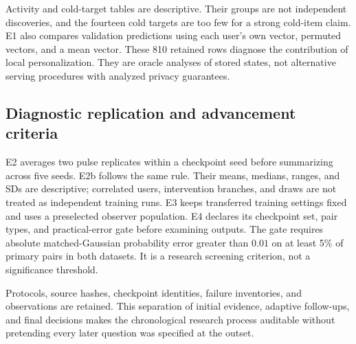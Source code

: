 Activity and cold-target tables are descriptive. Their groups are not
independent discoveries, and the fourteen cold targets are too few for a
strong cold-item claim. E1 also compares validation predictions using each
user's own vector, permuted vectors, and a mean vector. These 810 retained
rows diagnose the contribution of local personalization. They are oracle
analyses of stored states, not alternative serving procedures with analyzed
privacy guarantees.

\subsection{Diagnostic replication and advancement criteria}
E2 averages two pulse replicates within a checkpoint seed before summarizing
across five seeds. E2b follows the same rule. Their means, medians, ranges,
and SDs are descriptive; correlated users, intervention branches, and draws
are not treated as independent training runs. E3 keeps transferred training
settings fixed and uses a preselected observer population. E4 declares its
checkpoint set, pair types, and practical-error gate before examining outputs.
The gate requires absolute matched-Gaussian probability error greater than
$0.01$ on at least 5\% of primary pairs in both datasets. It is a research
screening criterion, not a significance threshold.

Protocols, source hashes, checkpoint identities, failure inventories, and
observations are retained. This separation of initial evidence, adaptive
follow-ups, and final decisions makes the chronological research process
auditable without pretending every later question was specified at the outset.

